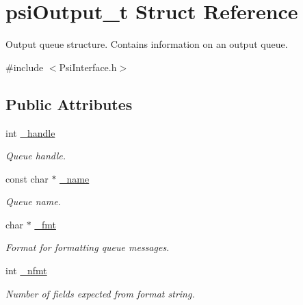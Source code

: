 \hypertarget{structpsiOutput__t}{}\section{psi\+Output\+\_\+t Struct Reference}
\label{structpsiOutput__t}


Output queue structure. Contains information on an output queue.  




{\ttfamily \#include $<$Psi\+Interface.\+h$>$}

\subsection*{Public Attributes}
\begin{DoxyCompactItemize}
\item 
\mbox{\label{structpsiOutput__t_a9ad7d02cf677183308724c7f9b8dbd52}} 
int \hyperlink{structpsiOutput__t_a9ad7d02cf677183308724c7f9b8dbd52}{\+\_\+handle}
\begin{DoxyCompactList}\small\item\em Queue handle. \end{DoxyCompactList}\item 
\mbox{\label{structpsiOutput__t_aee98b6f91ada5813222b6d0e70ee5223}} 
const char $\ast$ \hyperlink{structpsiOutput__t_aee98b6f91ada5813222b6d0e70ee5223}{\+\_\+name}
\begin{DoxyCompactList}\small\item\em Queue name. \end{DoxyCompactList}\item 
\mbox{\label{structpsiOutput__t_ab0d091406566578aff30e29f8f254dc0}} 
char $\ast$ \hyperlink{structpsiOutput__t_ab0d091406566578aff30e29f8f254dc0}{\+\_\+fmt}
\begin{DoxyCompactList}\small\item\em Format for formatting queue messages. \end{DoxyCompactList}\item 
\mbox{\label{structpsiOutput__t_a8ce9cd65bd278b405de93b96c595e33b}} 
int \hyperlink{structpsiOutput__t_a8ce9cd65bd278b405de93b96c595e33b}{\+\_\+nfmt}
\begin{DoxyCompactList}\small\item\em Number of fields expected from format string. \end{DoxyCompactList}\end{DoxyCompactItemize}


